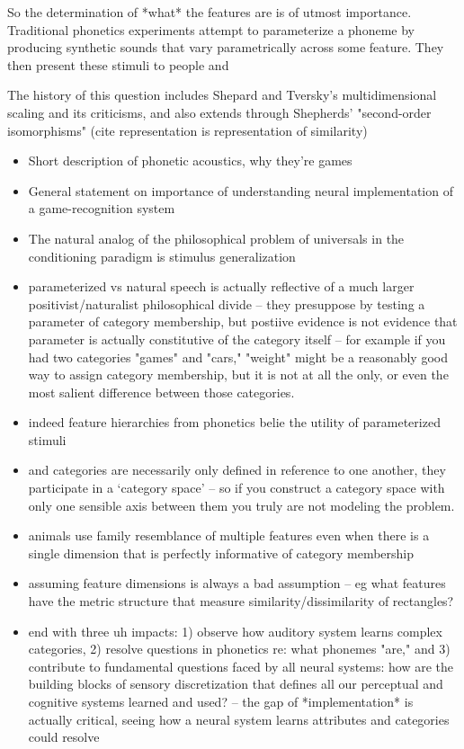 \begin{multicols}{2}
So the determination of *what* the features are is of utmost importance. Traditional phonetics experiments attempt to parameterize a phoneme by producing synthetic sounds that vary parametrically across some feature. They then present these stimuli to people and 

The history of this question includes Shepard and Tversky's multidimensional scaling and its criticisms, and also extends through Shepherds' "second-order isomorphisms" (cite representation is representation of similarity)

\begin{itemize}
	\item Short description of phonetic acoustics, why they're games
	\item General statement on importance of understanding neural implementation of a game-recognition system
	\item The natural analog of the philosophical problem of universals in the conditioning paradigm is stimulus generalization \cite{roschWittgensteinCategorizationResearch1987}
	\item parameterized vs natural speech is actually reflective of a much larger positivist/naturalist philosophical divide -- they presuppose by testing a parameter of category membership, but postiive evidence is not evidence that parameter is actually constitutive of the category itself -- for example if you had two categories "games" and "cars," "weight" might be a reasonably good way to assign category membership, but it is not at all the only, or even the most salient difference between those categories. 
	\item indeed feature hierarchies from phonetics belie the utility of parameterized stimuli
	\item and categories are necessarily only defined in reference to one another, they participate in a `category space' -- so if you construct a category space with only one sensible axis between them you truly are not modeling the problem.
	\item animals use family resemblance of multiple features even when there is a single dimension that is perfectly informative of category membership \cite{leaUseMultipleDimensions2008, couchmanRulesResemblanceTheir2010}
	\item assuming feature dimensions is always a bad assumption -- eg what features have the metric structure that measure similarity/dissimilarity of rectangles? \cite{krantzSimilarityRectanglesAnalysis1975a}
	\item end with three uh impacts: 1) observe how auditory system learns complex categories, 2) resolve questions in phonetics re: what phonemes "are," and 3) contribute to fundamental questions faced by all neural systems: how are the building blocks of sensory discretization that defines all our perceptual and cognitive systems learned and used? -- the gap of *implementation* is actually critical, seeing how a neural system learns attributes and categories could resolve 


\end{itemize}
\end{multicols}

